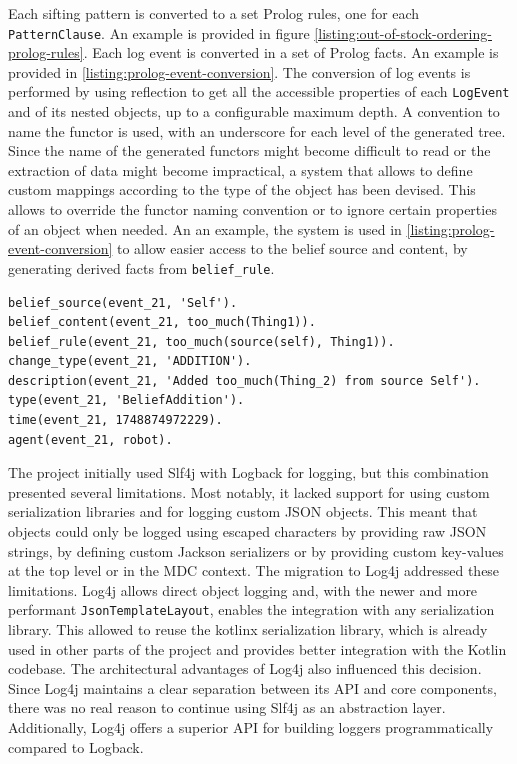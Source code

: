 \documentclass{scrartcl}
\begin{document}
Each sifting pattern is converted to a set Prolog rules, one for each \verb|PatternClause|.
%
An example is provided in figure \ref{listing:out-of-stock-ordering-prolog-rules}.
%
Each log event is converted in a set of Prolog facts.
%
An example is provided in \ref{listing:prolog-event-conversion}.
%
The conversion of log events is performed by using reflection to get all the accessible properties of each \verb|LogEvent| and of its nested objects, up to a configurable maximum depth. A convention to name the functor is used, with an underscore for each level of the generated tree.
%
Since the name of the generated functors might become difficult to read or the extraction of data might become impractical, a system that allows to define custom mappings according to the type of the object has been devised. 
%
This allows to override the functor naming convention or to ignore certain properties of an object when needed.
%
An an example, the system is used in \ref{listing:prolog-event-conversion} to allow easier access to the belief source and content, by generating derived facts from \verb|belief_rule|.

\begin{listing}
\begin{verbatim}
belief_source(event_21, 'Self').
belief_content(event_21, too_much(Thing1)).
belief_rule(event_21, too_much(source(self), Thing1)).
change_type(event_21, 'ADDITION').
description(event_21, 'Added too_much(Thing_2) from source Self').
type(event_21, 'BeliefAddition').
time(event_21, 1748874972229).
agent(event_21, robot).
\end{verbatim}
\caption{The prolog rules that are generated for a BeliefAddition log event.}
\label{listing:prolog-event-conversion}
\end{listing}

The project initially used Slf4j with Logback for logging, but this combination presented several limitations. 
%
Most notably, it lacked support for using custom serialization libraries and for logging custom JSON objects.
%
This meant that objects could only be logged using escaped characters by providing raw JSON strings, by defining custom Jackson serializers or by providing custom key-values at the top level or in the MDC context.
%       
The migration to Log4j addressed these limitations. Log4j allows direct object logging and, with the newer and more performant \verb|JsonTemplateLayout|, enables the integration with any serialization library.
%
This allowed to reuse the kotlinx serialization library, which is already used in other parts of the project and provides better integration with the Kotlin codebase.
%
The architectural advantages of Log4j also influenced this decision. Since Log4j maintains a clear separation between its API and core components, there was no real reason to continue using Slf4j as an abstraction layer. 
%
Additionally, Log4j offers a superior API for building loggers programmatically compared to Logback.
\end{document}
